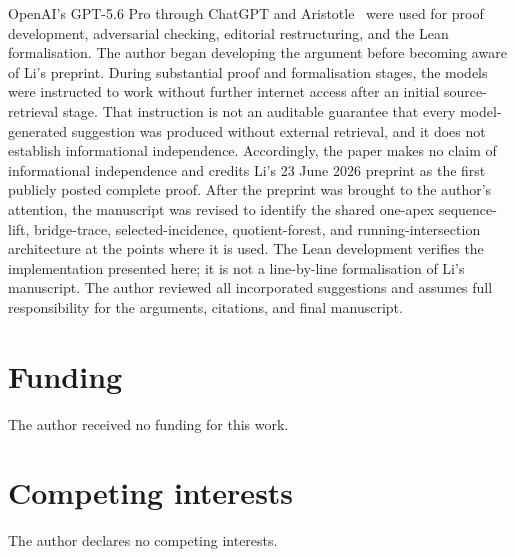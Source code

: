 \documentclass[a4paper,11pt,reqno]{amsart}
\theoremstyle{plain}
\theoremstyle{definition}
\theoremstyle{remark}
\begin{document}
OpenAI's GPT-5.6 Pro through ChatGPT and Aristotle~\citep{achim-et-al-2025}
were used for proof development, adversarial checking, editorial restructuring,
and the Lean formalisation.  The author began developing the argument before
becoming aware of Li's preprint.  During substantial proof and formalisation
stages, the models were instructed to work without further internet access
after an initial source-retrieval stage.  That instruction is not an auditable
guarantee that every model-generated suggestion was produced without external
retrieval, and it does not establish informational independence.  Accordingly,
the paper makes no claim of informational independence and credits Li's
23 June 2026 preprint as the first publicly posted complete proof.  After the
preprint was brought to the author's attention, the manuscript was revised to
identify the shared one-apex sequence-lift, bridge-trace, selected-incidence,
quotient-forest, and running-intersection architecture at the points where it
is used.  The Lean development verifies the implementation presented here;
it is not a line-by-line formalisation of Li's manuscript.  The author reviewed
all incorporated suggestions and assumes full responsibility for the
arguments, citations, and final manuscript.

\section*{Funding}
The author received no funding for this work.

\section*{Competing interests}
The author declares no competing interests.
\end{document}
